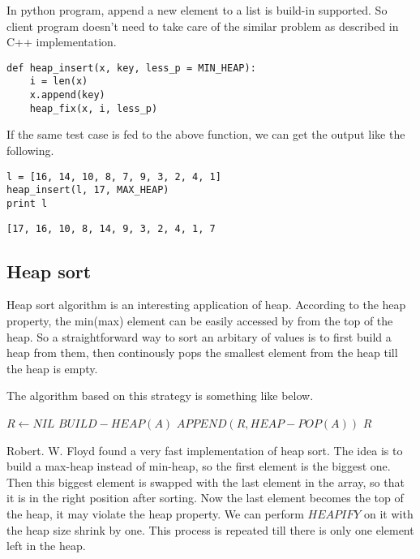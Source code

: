 \documentclass{article}
\begin{document}
In python program, append a new element to a list is build-in
supported. So client program doesn't need to take care of the
similar problem as described in C++ implementation.

\lstset{language=Python}
\begin{lstlisting}
def heap_insert(x, key, less_p = MIN_HEAP):
    i = len(x)
    x.append(key)
    heap_fix(x, i, less_p)
\end{lstlisting}

If the same test case is fed to the above function, we can 
get the output like the following.

\begin{lstlisting}
l = [16, 14, 10, 8, 7, 9, 3, 2, 4, 1]
heap_insert(l, 17, MAX_HEAP)
print l
\end{lstlisting}

\begin{verbatim}
[17, 16, 10, 8, 14, 9, 3, 2, 4, 1, 7
\end{verbatim}

\subsection{Heap sort}
\label{heap-sort}

Heap sort algorithm is an interesting application of heap. According
to the heap property, the min(max) element can be easily accessed
by from the top of the heap. So a straightforward way to sort an
arbitary of values is to first build a heap from them, then continously
pops the smallest element from the heap till the heap is empty.

The algorithm based on this strategy is something like below.

\begin{algorithmic}[1]
  \State $R \gets NIL$
  \State $BUILD-HEAP(A)$
    \State $APPEND(R, HEAP-POP(A))$
  \EndWhile
  \State \Return $R$
\EndFunction
\end{algorithmic}

Robert. W. Floyd found a very fast implementation of heap sort.
The idea is to build a max-heap instead of min-heap, so the first
element is the biggest one. Then this biggest element is swapped
with the last element in the array, so that it is in the right
position after sorting. Now the last element becomes the top
of the heap, it may violate the heap property. We can perform
$HEAPIFY$ on it with the heap size shrink by one. This process
is repeated till there is only one element left in the heap.
\end{document}
